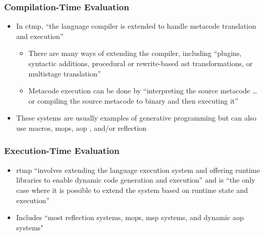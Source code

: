 \subsubsection{Compilation-Time Evaluation \cite[p.~113:21-23]{lilis_survey_2019}}
\begin{itemize}
      \item In \acf{ctmp}, ``the language compiler is extended to handle
            metacode translation and execution'' \cite[p.~113:22]{lilis_survey_2019}
            \begin{itemize}
                  \item There are many ways of extending the compiler,
                        including ``plugins, syntactic additions, procedural or
                        rewrite-based \acs{ast} transformations, or multistage
                        translation'' \cite[p.~113:22]{lilis_survey_2019}
                  \item Metacode execution can be done by ``interpreting the
                        source metacode \dots or compiling the source metacode
                        to binary and then executing it''
                        \cite[p.~113:22]{lilis_survey_2019}
            \end{itemize}
      \item These systems are usually examples of generative programming but
            can also use macros, \acsp{mop}, \acs{aop}
            \cite[p.~113:22]{lilis_survey_2019}, and/or reflection
            \cite[p.~113:23]{lilis_survey_2019}
\end{itemize}

\subsubsection{Execution-Time Evaluation \cite[p.~113:23-25]{lilis_survey_2019}}
\begin{itemize}
      \item \acf{rtmp} ``involves extending the language execution system and
            offering runtime libraries to enable dynamic code generation and
            execution'' and is ``the only case where it is possible to extend the
            system based on runtime state and execution''
            \cite[p.~113:23]{lilis_survey_2019}
      \item Includes ``most reflection systems, \acsp{mop}, \acs{msp} systems,
            and dynamic \acs{aop} systems" \cite[p.~113:31]{lilis_survey_2019}
\end{itemize}

